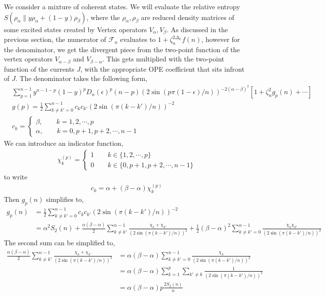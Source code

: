 \documentclass[11pt]{article}
\newcommand{\ep}{\epsilon}
\newcommand{\lb}{\left(}
\newcommand{\rb}{\right)}
\begin{document}
We consider a mixture of coherent states. We will evaluate the relative entropy $S(\rho_\alpha \|y\rho_\alpha + (1-y)\rho_\beta)$, where the $\rho_{\alpha},\rho_\beta$ are reduced density matrices of some excited states created by Vertex operators $V_\alpha, V_\beta$. As discussed in the previous section, the numerator of $\mathcal{F}_n$ evaluates to $1+ \zeta_n^{2\Delta_L}f(n)$, however for the denominator, we get the divergent piece from the two-point function of the vertex operators $V_{\alpha- \beta}$ and $V_{\beta- \alpha}$. This gets multiplied with the two-point function of the currents $J$, with the appropriate OPE coefficient that sits infront of $J$. The denominator takes the following form,
\begin{align}
    &\sum_{p=1}^{n-1} y^{n-1-p} (1-y)^p D_n(\ep)^p (n-p) \lb 2\sin(p\pi(1-\ep)/n)\rb^{-2(\alpha - \beta)^2} \left[  1+ \zeta_n^2 g_p(n) + \cdots  \right]\\
    &g(p) =  \frac{1}{2}\sum_{k\neq k' =0}^{n-1} c_k c_{k'} \lb 2\sin( \pi (k-k')/n )\rb^{-2}\\
    &c_k = \begin{cases}
        \beta , \qquad  k = 1,2,\cdots ,p \\
        \alpha , \qquad k = 0 ,p+1, p+2, \cdots, n-1
    \end{cases}
\end{align}
We can introduce an indicator function,
\begin{align}
    \chi_k^{(p)} = \begin{cases}
        1 \qquad k \in \{ 1, 2 ,\cdots , p\}\\
        0 \qquad k\in \{0,p+1,p+2, \cdots , n-1 \} 
    \end{cases}
\end{align}
to write 
\begin{align}
    c_k = \alpha + (\beta - \alpha)\chi_k^{(p)}
\end{align}
Then $g_p(n)$ simplifies to,
\begin{align}
    g_p(n) &= \frac{1}{2}\sum_{k\neq k' = 0}^{n-1} c_k c_{k'} \lb 2\sin( \pi (k-k')/n )\rb^{-2} \\
    &= \alpha^2 S_2(n) + \frac{\alpha (\beta - \alpha) }{2}\sum_{k\neq k'}^{n-1}\frac{\chi_k + \chi_{k'}}{\lb2\sin (\pi (k-k')/n)\rb^2} + \frac{1}{2}(\beta - \alpha)^2 \sum_{k\neq k'=0}^{n-1} \frac{\chi_k \chi_{k'}}{\lb2\sin (\pi (k-k')/n)\rb^2}
\end{align}
The second sum can be simplified to,
\begin{align}
     \frac{\alpha (\beta - \alpha) }{2}\sum_{k\neq k'}^{n-1}\frac{\chi_k + \chi_{k'}}{\lb2\sin (\pi (k-k')/n)\rb^2} &= \alpha (\beta - \alpha) \sum_{k\neq k' = 0}^{n-1} \frac{\chi_k}{\lb2\sin (\pi (k-k')/n)\rb^2} \\
     &=\alpha (\beta - \alpha) \sum_{k=1}^p \sum_{k'\neq k} \frac{1}{\lb2\sin (\pi (k-k')/n)\rb^2}\\
     &= \alpha (\beta - \alpha)p \frac{2S_2(n)}{n}
\end{align}
\end{document}
